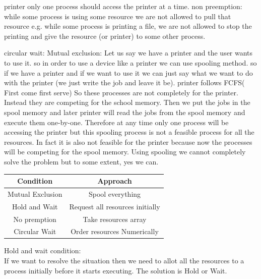 \documentclass[12pt,letterpaper]{article}
\begin{document}
  printer only one process should access the printer at a time. 
  non preemption: 
  while some process is using some resource we are not allowed to pull that resource
  e.g. while some process is printing a file, we are not allowed to stop the printing
  and give the resource (or printer) to some other process. 

  circular wait:
  Mutual exclusion: 
  Let us say we have a printer and the user wants to use it. so in order 
  to use a device like a printer we can use spooling method. so if we have a 
  printer and if we want to use it we can just say what we want to do with the 
  printer (we just write the job and leave it be). printer follows FCFS( First come 
  first serve) 
  So these processes are not completely for the printer. Instead they are competing 
  for the school memory. Then we put the jobs in the spool memory and later printer will 
  read the jobs from the spool memory and execute them one-by-one. Therefore at any 
  time only one process will be accessing the printer but this spooling process is 
  not a feasible process for all the resources. In fact it is also not feasible for the 
  printer because now the processes will be competing for the spool memory. 
  Using spooling we cannot completely solve the problem but to some extent, yes we can.
  \begin{table}[h]
    \centering 
    \begin{tabular}{|c|c|}
      \hline 
      \textbf{Condition} & \textbf{Approach}\\
      \hline
      Mutual Exclusion & Spool everything\\
      Hold and Wait & Request all resources initially\\
      No premption & Take resources array\\
      Circular Wait & Order resources Numerically\\
      \hline
    \end{tabular}
  \end{table}
  Hold and wait condition: \\ 
  If we want to resolve the situation then we need to allot all the resources to 
  a process initially before it starts executing. 
  The solution is Hold or Wait. 
\end{document}
